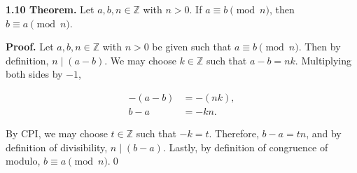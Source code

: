 \documentclass[12pt]{article}
\begin{document}
\noindent\textbf{1.10 Theorem.} Let $a,b,n\in\mathbb{Z}$ with $n>0$. If $a\equiv b\pmod{n}$, then $b\equiv a\pmod{n}$.

\bigskip

\noindent\textbf{Proof.} Let $a,b,n\in\mathbb{Z}$ with $n>0$ be given such that $a\equiv b\pmod{n}$. Then by definition, $n\mid(a-b)$. We may choose $k\in\mathbb{Z}$ such that $a-b=nk$. Multiplying both sides by $-1$,


\begin{align*}
-(a-b) &= -(nk), \\
b-a &= -kn.
\end{align*}


\noindent By CPI, we may choose $t\in\mathbb{Z}$ such that $-k=t$. Therefore, $b-a=tn$, and by definition of divisibility, $n\mid(b-a)$. Lastly, by definition of congruence of modulo, $b\equiv a\pmod{n}$.\qed
\end{document}
